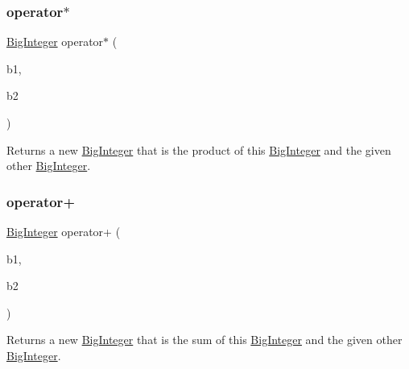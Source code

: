 \subsubsection{\texorpdfstring{operator$\ast$}{operator*}}
{\footnotesize\ttfamily \mbox{\hyperlink{classBigInteger}{Big\+Integer}} operator$\ast$ (\begin{DoxyParamCaption}\item[{const \mbox{\hyperlink{classBigInteger}{Big\+Integer}} \&}]{b1,  }\item[{const \mbox{\hyperlink{classBigInteger}{Big\+Integer}} \&}]{b2 }\end{DoxyParamCaption})\hspace{0.3cm}{\ttfamily [friend]}}



Returns a new \mbox{\hyperlink{classBigInteger}{Big\+Integer}} that is the product of this \mbox{\hyperlink{classBigInteger}{Big\+Integer}} and the given other \mbox{\hyperlink{classBigInteger}{Big\+Integer}}. 

\mbox{\label{classBigInteger_a60c054a92aedb2aabf4b18d1fece1773}} 
\subsubsection{\texorpdfstring{operator+}{operator+}}
{\footnotesize\ttfamily \mbox{\hyperlink{classBigInteger}{Big\+Integer}} operator+ (\begin{DoxyParamCaption}\item[{const \mbox{\hyperlink{classBigInteger}{Big\+Integer}} \&}]{b1,  }\item[{const \mbox{\hyperlink{classBigInteger}{Big\+Integer}} \&}]{b2 }\end{DoxyParamCaption})\hspace{0.3cm}{\ttfamily [friend]}}



Returns a new \mbox{\hyperlink{classBigInteger}{Big\+Integer}} that is the sum of this \mbox{\hyperlink{classBigInteger}{Big\+Integer}} and the given other \mbox{\hyperlink{classBigInteger}{Big\+Integer}}. 

\mbox{\label{classBigInteger_ade6e91641d142240dc488b015c75504e}} 
